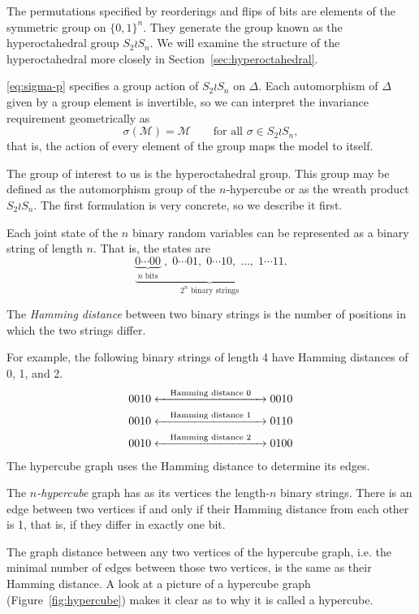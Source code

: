 \documentclass[cclicense]{hmcthesis}
\providecommand*{\ms}{\mathcal M}
\numberwithin{equation}{chapter}
\numberwithin{thmcounter}{chapter}
\begin{document}
    The permutations specified by reorderings and flips of bits are elements of
    the symmetric group on $\{0, 1\}^n$.  They generate the group known as the
    hyperoctahedral group $S_2 \wr S_n$.  We will examine the structure of the
    hyperoctahedral more closely in Section~\ref{sec:hyperoctahedral}.

    \eqref{eq:sigma-p} specifies a group action of $S_2 \wr S_n$ on $\Delta$.
    Each automorphism of $\Delta$ given by a group element is invertible, so we
    can interpret the invariance requirement geometrically as
    \[
        \sigma(\ms) = \ms
        \qquad
        \text{for all $\sigma \in S_2 \wr S_n$},
    \]
    that is, the action of every element of the group maps the model to itself.


    The group of interest to us is the hyperoctahedral group.  This group may be
    defined as the automorphism group of the $n$-hypercube or as the wreath
    product $S_2 \wr S_n$.
    The first formulation is very concrete, so we describe it first. 

    Each joint state of the $n$ binary random variables can be represented as a
    binary string of length $n$.  That is, the states are
    \[
        \underbrace{
        \underbrace{0\cdots00}_\text{$n$ bits}\;,\;
        0\cdots01,\;
        0\cdots10,\;
        \ldots,\;
        1\cdots11
        }_\text{$2^n$ binary strings}.
    \]
    \begin{definition}
    The \emph{Hamming distance} between two binary strings is the number of
    positions in which the two strings differ.  
    \end{definition}
    For example, the following binary strings of length 4 have Hamming distances
    of 0, 1, and 2.
    \begin{align*}
        0010 &\xleftrightarrow{\quad\text{Hamming distance $0$}\quad} 0010 \\
        0010 &\xleftrightarrow{\quad\text{Hamming distance $1$}\quad} 0110 \\
        0010 &\xleftrightarrow{\quad\text{Hamming distance $2$}\quad} 0100
    \end{align*}
    The hypercube graph uses the Hamming distance to determine its edges.
    \begin{definition}
        The \emph{$n$-hypercube} graph has as its vertices the length-$n$ binary
        strings.  There is an edge between two vertices if and only if
        their Hamming distance from each other is 1, that is, if they differ in
        exactly one bit.
    \end{definition}
    The graph distance between any two vertices of the hypercube graph, i.e. the
    minimal number of edges between those two vertices, is the same as their
    Hamming distance.  A look at a picture of a hypercube graph
    (Figure~\ref{fig:hypercube}) makes it clear as to why it is called a
    hypercube.
\end{document}
